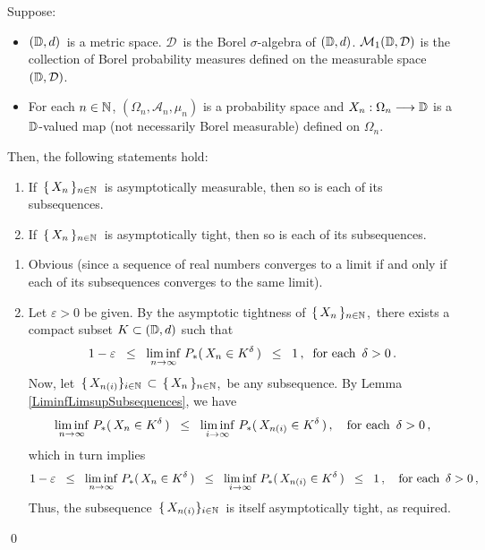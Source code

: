 \begin{proposition}
\mbox{}\vskip 0.1cm
\noindent
Suppose:
\begin{itemize}
\item
	$(\mathbb{D},d)$\, is a metric space.
	$\mathcal{D}$\, is the Borel $\sigma$-algebra of $(\mathbb{D},d)$.
	\vskip 0.0cm
	$\mathcal{M}_{1}(\mathbb{D},\mathcal{D})$ is the collection of Borel probability measures
	defined on the measurable space $(\mathbb{D},\mathcal{D})$.
\item
	For each $n \in \mathbb{N}$,
	$(\Omega_{n},\mathcal{A}_{n},\mu_{n})$ is a probability space and
	$X_{n} : \Omega_{n} \longrightarrow \mathbb{D}$
	is a $\mathbb{D}$-valued map (not necessarily Borel measurable) defined on $\Omega_{n}$.
\end{itemize}
Then, the following statements hold:
\begin{enumerate}
\item
	If \,$\{\,X_{n}\,\}_{n\in\mathbb{N}}$\, is asymptotically measurable, then so is each of its subsequences.
\item
	If \,$\{\,X_{n}\,\}_{n\in\mathbb{N}}$\, is asymptotically tight, then so is each of its subsequences.
\end{enumerate}
\end{proposition}
\proof
\begin{enumerate}
\item
	Obvious (since a sequence of real numbers converges to a limit if and only if
	each of its subsequences converges to the same limit).
\item
	Let $\varepsilon > 0$ be given.
	By the asymptotic tightness of \,$\{\,X_{n}\,\}_{n\in\mathbb{N}}$,\,
	there exists a compact subset $K \subset (\mathbb{D},d)$ such that
	\begin{equation*}
	1 - \varepsilon
	\;\; \leq \;\; \underset{n\rightarrow\infty}{\liminf}\; P_{*}(\,X_{n} \in K^{\delta}\,)
	\;\; \leq \;\; 1\,,
	\;\;
	\textnormal{for each \,$\delta > 0$}\,.
	\end{equation*}
	Now, let 
	\,$\{\,X_{n(i)}\}_{i\in\mathbb{N}} \,\subset\, \{\,X_{n}\,\}_{n\in\mathbb{N}}$,\,
	be any subsequence.
	By Lemma \ref{LiminfLimsupSubsequences}, we have
	\begin{equation*}
	\underset{n\rightarrow\infty}{\liminf}\; P_{*}(\,X_{n} \in K^{\delta}\,)
	\;\; \leq \;\;
		\underset{i\rightarrow\infty}{\liminf}\; P_{*}(\,X_{n(i)} \in K^{\delta}\,)\,,
	\quad
	\textnormal{for each \,$\delta > 0$}\,,
	\end{equation*}
	which in turn implies
	\begin{equation*}
	1 - \varepsilon
	\;\; \leq \;\;
		\underset{n\rightarrow\infty}{\liminf}\; P_{*}(\,X_{n} \in K^{\delta}\,)
	\;\; \leq \;\;
		\underset{i\rightarrow\infty}{\liminf}\; P_{*}(\,X_{n(i)} \in K^{\delta}\,)
	\;\; \leq \;\;
		1\,,
	\quad
	\textnormal{for each \,$\delta > 0$}\,,
	\end{equation*}
	Thus, the subsequence \,$\{\,X_{n(i)}\}_{i\in\mathbb{N}}$\, is itself asymptotically tight, as required.
\end{enumerate}
\qed

